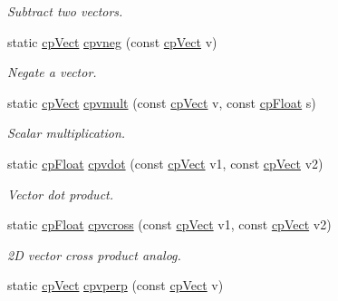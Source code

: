 \begin{DoxyCompactItemize}
\begin{DoxyCompactList}\small\item\em Subtract two vectors. \end{DoxyCompactList}\item 
\hypertarget{group__cp_vect_gab79a1d52de40bf0f7db5134da436426b}{}static \hyperlink{structcp_vect}{cp\+Vect} \hyperlink{group__cp_vect_gab79a1d52de40bf0f7db5134da436426b}{cpvneg} (const \hyperlink{structcp_vect}{cp\+Vect} v)\label{group__cp_vect_gab79a1d52de40bf0f7db5134da436426b}

\begin{DoxyCompactList}\small\item\em Negate a vector. \end{DoxyCompactList}\item 
\hypertarget{group__cp_vect_ga717188d925550baf62188b5e1e602047}{}static \hyperlink{structcp_vect}{cp\+Vect} \hyperlink{group__cp_vect_ga717188d925550baf62188b5e1e602047}{cpvmult} (const \hyperlink{structcp_vect}{cp\+Vect} v, const \hyperlink{group__basic_types_gac1ed65573e035bf892505768c852d8d3}{cp\+Float} s)\label{group__cp_vect_ga717188d925550baf62188b5e1e602047}

\begin{DoxyCompactList}\small\item\em Scalar multiplication. \end{DoxyCompactList}\item 
\hypertarget{group__cp_vect_ga3e76653b018d47f864c339092cf482f1}{}static \hyperlink{group__basic_types_gac1ed65573e035bf892505768c852d8d3}{cp\+Float} \hyperlink{group__cp_vect_ga3e76653b018d47f864c339092cf482f1}{cpvdot} (const \hyperlink{structcp_vect}{cp\+Vect} v1, const \hyperlink{structcp_vect}{cp\+Vect} v2)\label{group__cp_vect_ga3e76653b018d47f864c339092cf482f1}

\begin{DoxyCompactList}\small\item\em Vector dot product. \end{DoxyCompactList}\item 
static \hyperlink{group__basic_types_gac1ed65573e035bf892505768c852d8d3}{cp\+Float} \hyperlink{group__cp_vect_gaf9618b7690ad0c67dbe143c640590f7b}{cpvcross} (const \hyperlink{structcp_vect}{cp\+Vect} v1, const \hyperlink{structcp_vect}{cp\+Vect} v2)
\begin{DoxyCompactList}\small\item\em 2\+D vector cross product analog. \end{DoxyCompactList}\item 
\hypertarget{group__cp_vect_gac4a0ba2873900342126c0449918764bc}{}static \hyperlink{structcp_vect}{cp\+Vect} \hyperlink{group__cp_vect_gac4a0ba2873900342126c0449918764bc}{cpvperp} (const \hyperlink{structcp_vect}{cp\+Vect} v)\label{group__cp_vect_gac4a0ba2873900342126c0449918764bc}


\end{DoxyCompactItemize}
